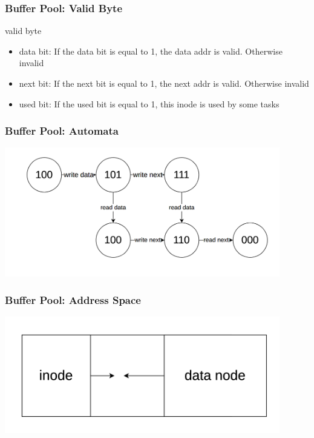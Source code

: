 \documentclass[notheorems, aspectratio=54]{beamer}
\begin{document}
\begin{frame}
    \frametitle{Buffer Pool: Valid Byte}
    \begin{block} {valid byte}
        \begin{itemize}
            \item data bit: If the data bit is equal to 1, the data addr is valid. Otherwise invalid
            \item next bit: If the next bit is equal to 1, the next addr is valid. Otherwise invalid
            \item used bit: If the used bit is equal to 1, this inode is used by some tasks
        \end{itemize}
    \end{block}
\end{frame}

\begin{frame}
    \frametitle{Buffer Pool: Automata}
    \centering
    \includegraphics[width=12cm]{global_img_dir/automata.png}
\end{frame}

\begin{frame}
    \frametitle{Buffer Pool: Address Space}
    \centering
    \includegraphics[width=12cm]{global_img_dir/space.png}
\end{frame}
\end{document}

